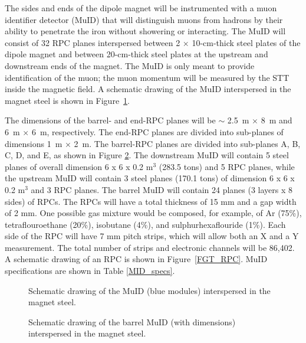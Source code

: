 The sides and ends of the dipole magnet will be instrumented
with a muon identifier
detector (MuID) that will distinguish muons from hadrons by their ability 
to penetrate the iron without showering or interacting.
The MuID will consist of 32 RPC planes
interspersed between 2 $\times$ 10-cm-thick steel plates of the 
dipole magnet and between 20-cm-thick steel plates at the upstream and
downstream ends of the magnet. 
The MuID is only meant to provide %
identification of the 
muon; the muon momentum %
will be measured by the STT inside the 
magnetic field. A schematic drawing of the MuID 
interspersed in the magnet steel is shown in Figure~\ref{FGT_MuID}.

The dimensions of the barrel- and end-RPC planes will be $\sim$ 2.5~m $\times$ 8~m and
6~m $\times$ 6~m, respectively. The end-RPC planes are divided into 
sub-planes of dimensions 1~m $\times$ 2~m. The barrel-RPC planes are divided into
sub-planes A, B, C, D, and E, as shown in Figure \ref{MuID_detail}. 
The downstream MuID will contain 5 steel planes of 
overall dimension
6 x 6 x 0.2 m$^3$ (283.5 tons)
and 5 RPC planes, while the upstream MuID will contain 3 steel
planes (170.1 tons) of dimension 6 x 6 x 0.2 m$^3$ and 3 RPC planes. The barrel MuID will contain
24 planes (3 layers x 8 sides) of RPCs. The RPCs will have a total thickness 
of 15 mm and a gap width of 2 mm. One possible gas mixture would be composed, for example,
of Ar (75\%), tetraflouroethane (20\%), isobutane (4\%),
and sulphurhexaflouride (1\%). Each side of the RPC will have 7 mm pitch strips, which will
allow both an X and a Y measurement. The total number of strips and electronic channels will
be 86,402. A schematic drawing of an RPC is shown in Figure~\ref{FGT_RPC}.
MuID specifications are shown in Table \ref{MID_specs}.

\begin{figure}[htp]
\begin{center}
\caption{\label{FGT_MuID} Schematic drawing of the MuID (blue modules) interspersed in the magnet steel.}
\end{center}
\end{figure}

\begin{figure}[htp]
\begin{center}
\caption{\label{MuID_detail} Schematic drawing of the barrel MuID (with dimensions) 
interspersed in the magnet steel.}
\end{center}
\end{figure}


